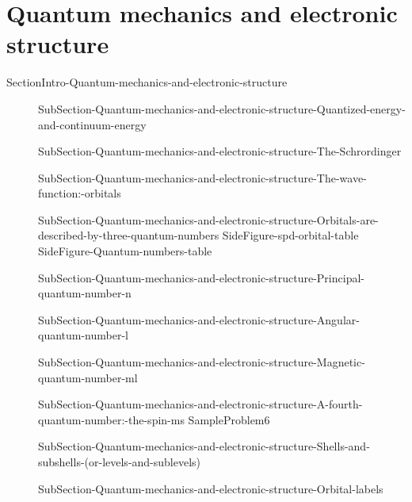 \documentclass[main.tex]{subfiles}
\newcommand\chapterlabel{Ch-radiation}\setcounter{figurenewcounter}{0}\setcounter{tablenewcounter}{0}\setcounter{formulanewcounter}{0}
\begin{document}
\section{Quantum mechanics and electronic structure}{SectionIntro-Quantum-mechanics-and-electronic-structure}
\sloppy
\begin{description}
\item[] {SubSection-Quantum-mechanics-and-electronic-structure-Quantized-energy-and-continuum-energy}
 \item[] {SubSection-Quantum-mechanics-and-electronic-structure-The-Schrordinger}
\item[] {SubSection-Quantum-mechanics-and-electronic-structure-The-wave-function:-orbitals}
\item[] {SubSection-Quantum-mechanics-and-electronic-structure-Orbitals-are-described-by-three-quantum-numbers}
 {SideFigure-spd-orbital-table}
{SideFigure-Quantum-numbers-table}
 \item[]{SubSection-Quantum-mechanics-and-electronic-structure-Principal-quantum-number-n}
 \item[]{SubSection-Quantum-mechanics-and-electronic-structure-Angular-quantum-number-l}

 \item[]{SubSection-Quantum-mechanics-and-electronic-structure-Magnetic-quantum-number-ml}
 \item[] {SubSection-Quantum-mechanics-and-electronic-structure-A-fourth-quantum-number:-the-spin-ms}
  {SampleProblem6}
 
 \item[] {SubSection-Quantum-mechanics-and-electronic-structure-Shells-and-subshells-(or-levels-and-sublevels)}
\item[] {SubSection-Quantum-mechanics-and-electronic-structure-Orbital-labels}
\newpage\vspace{5cm}{Figure-Shell-and-subshell}


\end{description}
\end{document}
